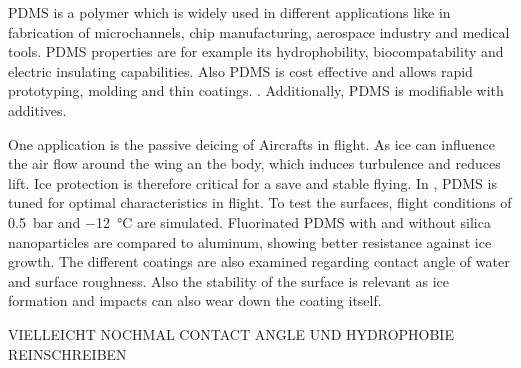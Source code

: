 
PDMS is a polymer which is widely used in different applications like in fabrication of microchannels, chip manufacturing, aerospace industry and medical tools. PDMS properties are for example its hydrophobility, biocompatability and electric insulating capabilities. Also PDMS is cost effective and allows rapid prototyping, molding and thin coatings. \cite{Wolf.2018}. Additionally, PDMS is modifiable with additives.

One application is the passive deicing of Aircrafts in flight. As ice can influence the air flow around the wing an the body, which induces turbulence and reduces lift. Ice protection is therefore critical for a save and stable flying. In \cite{Liu.2018}, PDMS is tuned for optimal characteristics in flight. To test the surfaces, flight conditions of \SI{0.5}{\bar} and \SI{-12}{\degreeCelsius} are simulated. Fluorinated PDMS with and without silica nanoparticles are compared to aluminum, showing better resistance against ice growth. The different coatings are also examined regarding contact angle of water and surface roughness. Also the stability of the surface is relevant as ice formation and impacts can also wear down the coating itself. 

VIELLEICHT NOCHMAL CONTACT ANGLE UND HYDROPHOBIE REINSCHREIBEN 
